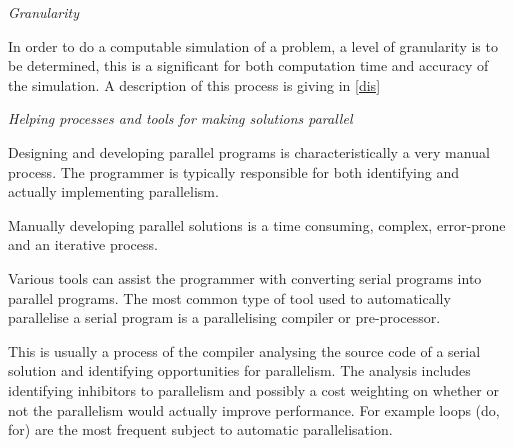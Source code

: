 \emph{Granularity}

In order to do a computable simulation of a problem, a level of granularity is to be determined, this is a significant for both computation time and accuracy of the simulation. A description of this process is giving in \cref{dis}

\emph{Helping processes and tools for making solutions parallel}

Designing and developing parallel programs is characteristically a very manual process. The programmer is typically responsible for both identifying and actually implementing parallelism.

Manually developing parallel solutions is a time consuming, complex, error-prone and an iterative process.

Various tools can assist the programmer with converting serial programs into parallel programs. The most common type of tool used to automatically parallelise a serial program is a parallelising compiler or pre-processor.

This is usually a process of the compiler analysing the source code of a serial solution and identifying opportunities for parallelism. The analysis includes identifying inhibitors to parallelism and possibly a cost weighting on whether or not the parallelism would actually improve performance. For example loops (do, for) are the most frequent subject to automatic parallelisation.